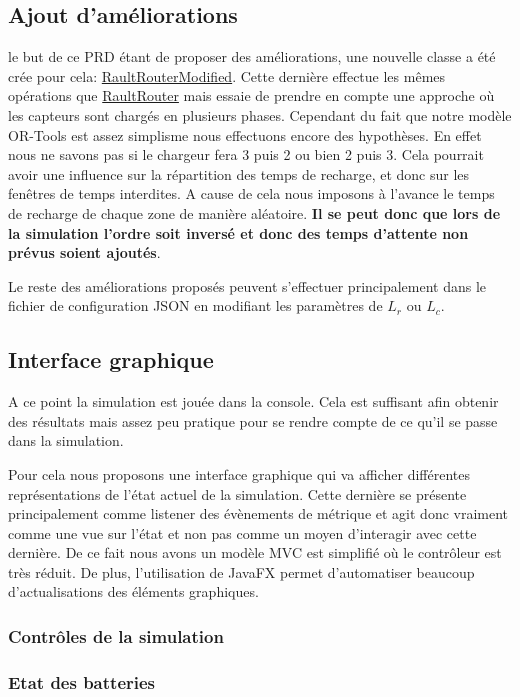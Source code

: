 \documentclass[final]{polytech/polytech}
\newcommand{\klass}[1]{\hyperref[class:#1]{#1}}
\begin{document}
		\subsection{Ajout d'améliorations}
			le but de ce PRD étant de proposer des améliorations, une nouvelle classe a été crée pour cela:
			 \klass{RaultRouterModified}.
			 Cette dernière effectue les mêmes opérations que \klass{RaultRouter} mais essaie de prendre en compte une approche où les capteurs sont chargés en plusieurs phases.
			 Cependant du fait que notre modèle OR-Tools est assez simplisme nous effectuons encore des hypothèses.
			 En effet nous ne savons pas si le chargeur fera 3 puis 2 ou bien 2 puis 3.
			 Cela pourrait avoir une influence sur la répartition des temps de recharge, et donc sur les fenêtres de temps interdites.
			 A cause de cela nous imposons à l'avance le temps de recharge de chaque zone de manière aléatoire.
			 \textbf{Il se peut donc que lors de la simulation l'ordre soit inversé et donc des temps d'attente non prévus soient ajoutés}.
			 
			 Le reste des améliorations proposés peuvent s'effectuer principalement dans le fichier de configuration JSON en modifiant les paramètres de $L_r$ ou $L_c$.
			
		\subsection{Interface graphique}
			A ce point la simulation est jouée dans la console.
			Cela est suffisant afin obtenir des résultats mais assez peu pratique pour se rendre compte de ce qu'il se passe dans la simulation.
			
			Pour cela nous proposons une interface graphique qui va afficher différentes représentations de l'état actuel de la simulation.
			Cette dernière se présente principalement comme listener des évènements de métrique et agit donc vraiment comme une vue sur l'état et non pas comme un moyen d'interagir avec cette dernière.
			De ce fait nous avons un modèle MVC est simplifié où le contrôleur est très réduit.
			De plus, l'utilisation de JavaFX permet d'automatiser beaucoup d'actualisations des éléments graphiques.
			
			\subsubsection{Contrôles de la simulation}
				
			
			\subsubsection{Etat des batteries}
			
\end{document}
